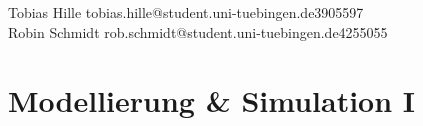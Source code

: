 \documentclass[12pt]{article}
\begin{document}
\def\arraystretch{1.2}%

Tobias Hille\hspace{1cm}
tobias.hille@student.uni-tuebingen.de\hspace{1cm}3905597\\
Robin Schmidt\hspace{1cm}
rob.schmidt@student.uni-tuebingen.de\hspace{1cm}4255055\\
\section*{Modellierung \& Simulation I}
%

\end{document}
